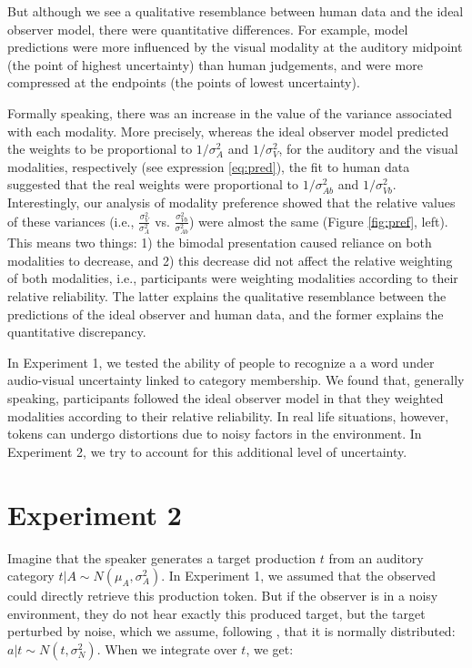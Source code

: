 \documentclass[10pt,letterpaper]{article}
\begin{document}
But although we see a qualitative resemblance between human data and the ideal observer model, there were quantitative differences. For example, model predictions were more influenced by the visual modality at the auditory midpoint (the point of highest uncertainty) than human judgements, and were more compressed at the endpoints (the points of lowest uncertainty).

Formally speaking, there was an increase in the value of the variance associated with each modality. More precisely, whereas the ideal observer model predicted the weights to be proportional to $1/\sigma^2_{A}$ and $1/\sigma^2_{V}$, for the auditory and the visual modalities, respectively (see expression \ref{eq:pred}), the fit to human data suggested that the real weights were proportional to $1/\sigma^2_{Ab}$ and $1/\sigma^2_{Vb}$. Interestingly, our analysis of modality preference showed that the relative values of these variances (i.e., $\frac{\sigma^2_V}{\sigma^2_A}$ vs. $\frac{\sigma^2_{Vb}}{\sigma^2_{Ab}}$) were almost the same (Figure \ref{fig:pref}, left). This means two things: 1) the bimodal presentation caused reliance on both modalities to decrease, and 2) this decrease did not affect the relative weighting of both modalities, i.e., participants were weighting modalities according to their relative reliability. The latter explains the qualitative resemblance between the predictions of the ideal observer and human data, and the former explains the quantitative discrepancy.
\newline

In Experiment 1, we tested the ability of people to recognize a a word under audio-visual uncertainty linked to category membership. We found that, generally speaking, participants followed the ideal observer model in that they weighted modalities according to their relative reliability. In real life situations, however, tokens can undergo distortions due to noisy factors in the environment. In Experiment 2, we try to account for this additional level of uncertainty.

\section{Experiment 2}

Imagine that the speaker generates a target production $t$ from an auditory category
$t | A \sim N(\mu_{A}, \sigma^2_{A})$. In Experiment 1, we assumed that the observed could directly retrieve this production token. But if the observer is in a noisy environment, they do not hear exactly this produced target, but the target perturbed by noise, which we assume, following , that it is normally distributed: $a | t \sim N(t, \sigma^2_{N})$. When we integrate over $t$, we get:
\end{document}

